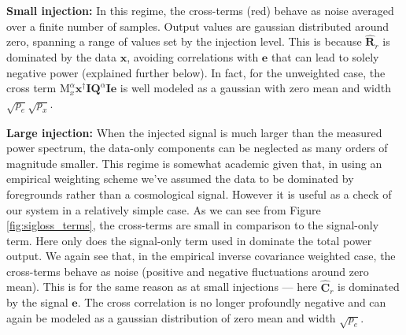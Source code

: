 \documentclass[preprint2,numberedappendix,tighten]{aastex6}  %
\begin{document}
{\bf Small injection:}
In this regime, the cross-terms (red) behave as noise averaged over a finite number of samples. Output values are gaussian distributed around zero, spanning a range of values set by the injection level. This is because $\widehat{\textbf{R}}_{r}$ is dominated by the data $\textbf{x}$, avoiding correlations with $\textbf{e}$ that can lead to solely negative power (explained further below). In fact, for the unweighted case, the cross term  $\text{M}^{\alpha}_{x}\textbf{x}^{\dagger}\textbf{I}\textbf{Q}^{\alpha}\textbf{I}\textbf{e}$ is well modeled as a gaussian with zero mean and width $\sqrt{p_e}\sqrt{p_x}$. %

{\bf Large injection:}
When the injected signal is much larger than the measured power spectrum, the data-only components can 
be neglected as many orders of magnitude smaller. This regime is somewhat academic given that, in using an empirical weighting scheme we've assumed the data to be dominated by foregrounds rather than a cosmological signal.  However it is useful as a check of our system in a relatively simple case.   As we can see from Figure \ref{fig:sigloss_terms}, the cross-terms are small in comparison to the signal-only term. Here only does the signal-only term used in   dominate the total power output. We again see that, in the empirical inverse covariance weighted case, the cross-terms behave as noise (positive and negative fluctuations around zero mean). This is for the same reason as at small injections --- here $\widehat{\textbf{C}}_{r}$ is dominated by the signal $\textbf{e}$. The cross correlation is no longer profoundly negative and can again be modeled as a gaussian distribution of zero mean and width $\sqrt{p_e}$.
\end{document}
